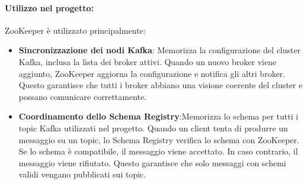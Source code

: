 \paragraph*{Utilizzo nel progetto:}
ZooKeeper è utilizzato principalmente:
\begin{itemize}
    \item \textbf{Sincronizzazione dei nodi Kafka}: Memorizza la configurazione del cluster Kafka, inclusa la lista dei broker attivi.
    Quando un nuovo broker viene aggiunto, ZooKeeper aggiorna la configurazione e notifica gli altri broker.
    Questo garantisce che tutti i broker abbiano una visione coerente del cluster e possano comunicare correttamente.
    \item \textbf{Coordinamento dello Schema Registry}:Memorizza lo schema per tutti i topic Kafka utilizzati nel progetto.
    Quando un client tenta di produrre un messaggio su un topic, lo Schema Registry verifica lo schema con ZooKeeper.
    Se lo schema è compatibile, il messaggio viene accettato. In caso contrario, il messaggio viene rifiutato.
    Questo garantisce che solo messaggi con schemi validi vengano pubblicati sui topic.
    
\end{itemize}
